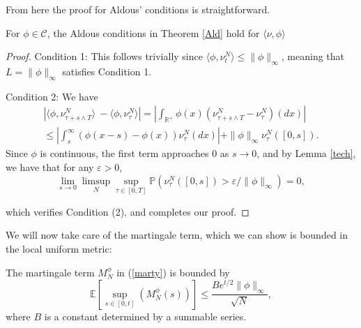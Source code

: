 From here the proof for Aldous' conditions is straightforward.
\begin{theorem} For $\phi \in \mathcal C$, the Aldous conditions in  Theorem \ref{Ald} hold for $\langle\nu, \phi\rangle$
\end{theorem}
\begin{proof}

Condition 1: This follows trivially since $\langle\phi, \nu_t^N\rangle \le \|\phi \|_\infty$, meaning that $L = \|\phi\|_\infty$ satisfies Condition 1.

Condition 2:   We have
\begin{eqnarray}
|\langle\phi,\nu_{\tau+s \wedge T}^N\rangle \  - \langle\phi,\nu_{\tau}^N\rangle| = \left| \int_{\mathbb{R}^+}\phi(x) (\nu_{\tau+s\wedge T}^N - \nu_\tau^N)(dx)\right | \\
\le \left | \int_s^\infty (\phi(x-s)-\phi(x))\nu_\tau^N(dx)  \right|+\|\phi\|_\infty \nu_{\tau}^N([0,s]). \nonumber
\end{eqnarray}
Since $\phi$ is continuous, the first term approaches 0 as $s \rightarrow 0$, and by Lemma \ref{tech}, we have that for any $\varepsilon >0$, 
  \begin{equation}
 \lim_{s \rightarrow 0}\limsup_N\sup_{\tau \in [0,T]}\mathbb P( \nu _{\tau}^N([0,s])>\varepsilon/\|\phi\|_\infty) = 0,     
\end{equation} 

which verifies Condition (2), and completes our proof.
\end{proof}

We will now take care of the martingale term, which we can show is bounded in the local uniform metric:


\begin{theorem}\label{martyproof}
The martingale term $M^\phi_N $ in (\ref{marty}) is bounded by 
\begin{equation}
\mathbb{E}\left[\sup_{s \in [0,t]}(M_N^\phi(s))\right] \le \frac{Be^{t/2}\|\phi\|_\infty}{\sqrt N},
\end{equation}
where $B$ is a constant determined by a summable series.
\end{theorem}

